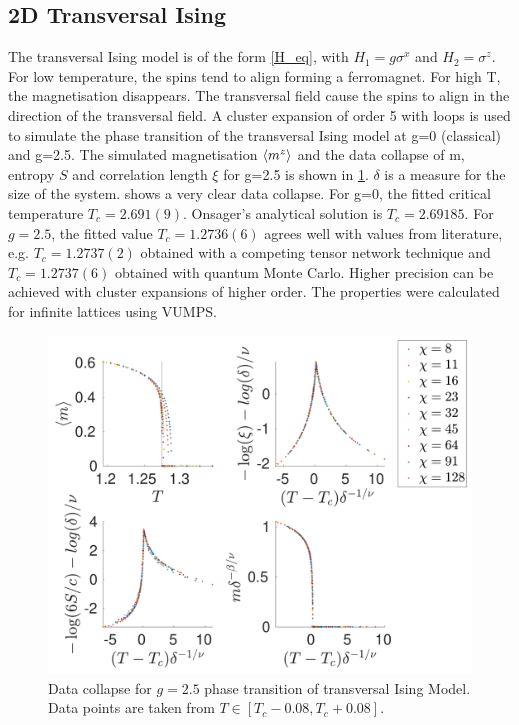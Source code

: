 \documentclass[twocolumn]{article}
\newcounter{a}
\newcounter{b}
\begin{document}
\subsection{2D Transversal Ising}
The transversal Ising model is of the form \cref{H_eq}, with $H_1=g  \sigma ^x$ and $H_2= \sigma^z$. For low temperature, the spins tend to align forming a ferromagnet. For high T, the magnetisation disappears. The transversal field cause the spins to align in the direction of the transversal field. A cluster expansion of order 5 with loops is used to simulate the phase transition of the transversal Ising model at g=0 (classical) and g=2.5. The simulated magnetisation $ \braket{m^z}$ and the data collapse of m, entropy $S$ and correlation length $\xi$ for g=2.5 is shown in \cref{fig:phase:g25:zoomed}. $\delta$ is a measure for the size of the system.  shows a very clear data collapse. For g=0, the fitted critical temperature $T_c = 2.691(9)$. Onsager's analytical solution is $T_c = 2.69185$. For $g=2.5$, the fitted value $T_c=1.2736(6)$ agrees well with values from literature, e.g. $T_c=1.2737(2)$ obtained with a competing tensor network technique and $T_c=1.2737(6)$ obtained with quantum Monte Carlo. \cite{Czarnik2019} Higher precision can be achieved with cluster expansions of higher order. The properties were calculated for infinite lattices using VUMPS.

\begin{figure}[h!]
    \center
    \includegraphics[width=\linewidth]{../Figuren/phasediag/g25/zoomed_small.pdf}
    \caption{ Data collapse for $g=2.5$ phase transition of transversal Ising Model. Data points are taken from $T \in \left[ T_c -0.08, T_c +0.08 \right]$. }
    \label{fig:phase:g25:zoomed}
\end{figure}
\end{document}
